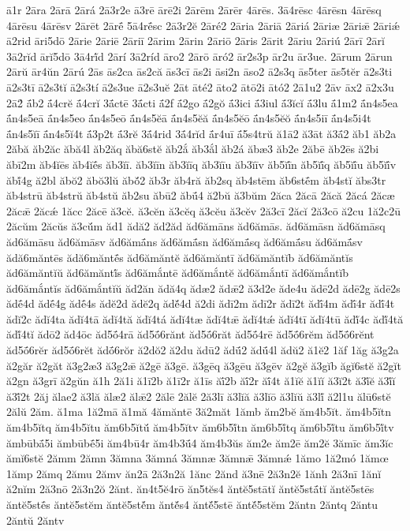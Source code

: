 {ā1r
2āra
2ārā
2ārá
2ā3r2e
ā3rē
ārē2i
2ārēm
2ārēr
4ārēs.
3ā4rēsc
4ārēsn
4ārēsq
4ārēsu
4ārēsv
2ārēt
2ārḗ
5ā4rḗsc
2ā3r2ĕ
2āré2
2āria
2āriā
2āriá
2āriæ
2āriǣ
2āriǽ
ā2rid
āri5dō
2ārie
2āriē
2āriī
2ārim
2ārin
2āriō
2āris
2ārit
2āriu
2āriú
2ārī
2ārĭ
3ā2rĭd
ārĭ5dō
3ā4rĭ́d
2ārí
3ā2ríd
āro2
2ārō
āró2
ār2s3p
ār2u
ār3ue.
2ārum
2ārun
2ārŭ
ār4ŭn
2ārú
2ās
ās2ca
ās2că
ās3cī
ās2i
āsi2n
āso2
ā2s3q
ās5ter
ās5tĕr
ā2s3ti
ā2s3tī
ā2s3tĭ
ā2s3tí
ā2s3ue
ā2s3uĕ
2āt
āté2
āto2
ātō2i
ātó2
2ā1u2
2āv
āx2
ā2x3u
2ā2́
ā́b2
ā́4crĕ
ā́4crĭ
3ā́ctē
3ā́cti
ā́2f
ā́2go
ā́2gŏ
ā́3ici
ā́3iul
ā́3ĭcĭ
ā́3lu
ā́1m2
ā́n4s5ea
ā́n4s5eā
ā́n4s5eo
ā́n4s5eō
ā́n4s5ĕā
ā́n4s5ĕă
ā́n4s5ĕō
ā́n4s5ĕŏ
ā́n4s5iī
ā́n4s5i4t
ā́n4s5ĭī
ā́n4s5ĭ4t
ā́3p2t
ā́3rĕ
3ā́4rid
3ā́4rĭd
ā́r4uī
ā́5s4trŭ
ă1ā2
ă3āt
ă3ā́2
ăb1
ăb2a
2ăbă
ăb2ăc
ăbă4l
ăb2ăq
ăbă6stĕ
ăb2ắ
ăb3ắl
ăb2á
ăbæ3
ăb2e
2ăbē
ăb2ēs
ă2bi
ăbī2m
ăb4ĭēs
ăb4ĭḗs
ăb3ĭī.
ăb3ĭīn
ăb3ĭīq
ăb3ĭīu
ăb3ĭīv
ăb5ĭī́n
ăb5ĭī́q
ăb5ĭī́u
ăb5ĭī́v
ăbĭ́4g
ă2bl
ăbŏ2
ăbŏ3lŭ
ăbŏ́2
ăb3r
ăb4ră
ăb2sq
ăb4stēm
ăb6stḗm
ăb4stĭ
ăbs3tr
ăb4strū
ăb4strŭ
ăb4stŭ
ăb2su
ăbū2
ăbū́4
ă2bŭ
ă3bŭm
2ăca
2ăcā
2ăcă
2ăcá
2ăcæ
2ăcǣ
2ăcǽ
1ăcc
2ăcē
ă3cĕ.
ă3cĕn
ă3cĕq
ă3cĕu
ă3cĕv
2ă3cī
2ăcĭ
2ă3cō
ă2cu
1ă2c2ū
2ăcŭm
2ăcŭs
ă3cŭ́m
ăd1
ădă2
ăd2ăd
ăd6ămāns
ăd6ămās.
ăd6ămāsn
ăd6ămāsq
ăd6ămāsu
ăd6ămāsv
ăd6ămā́ns
ăd6ămā́sn
ăd6ămā́sq
ăd6ămā́su
ăd6ămā́sv
ădă6măntēs
ădă6măntḗs
ăd6ămăntĕ
ăd6ămăntī
ăd6ămăntĭb
ăd6ămăntĭs
ăd6ămăntĭŭ
ăd6ămăntĭ́s
ăd6ămắntē
ăd6ămắntĕ
ăd6ămắntī
ăd6ămắntĭb
ăd6ămắntĭs
ăd6ămắntĭŭ
ăd2ăn
ădă4q
ădæ2
ădǣ2
ă3d2e
ăde4u
ădē2d
ădē2g
ădē2s
ădḗ4d
ădḗ4g
ădḗ4s
ădĕ2d
ădĕ2q
ădĕ́4d
ă2di
ădī2m
ădī2r
ădī2t
ădī́4m
ădī́4r
ădī́4t
ădĭ2c
ădĭ4ta
ădĭ4tā
ădĭ4tă
ădĭ4tá
ădĭ4tæ
ădĭ4tǣ
ădĭ4tǽ
ădĭ4tī
ădĭ4tū
ădĭ́4c
ădĭ́4tă
ădĭ́4tĭ
ădō2
ăd4ōc
ăd5ṓ4rā
ăd5ṓ6rănt
ăd5ṓ6răt
ăd5ṓ4rē
ăd5ṓ6rĕm
ăd5ṓ6rĕnt
ăd5ṓ6rĕr
ăd5ṓ6rĕt
ădṓ6rŏr
ă2dŏ2
ă2du
ădū2
ădū́2
ădū́4l
ădŭ2
ă1ĕ2
1ăf
1ăg
ă3g2a
ă2găr
ă2găt
ă3g2æ3
ă3g2ǣ
ă2gē
ă3gē.
ă3gēq
ă3gēu
ă3gēv
ă2gĕ
ă3gĭb
ăgĭ6stĕ
ă2gĭt
ă2gn
ă3grī
ă2gŭn
ă1h
2ă1i
ă1ī2b
ă1ī2r
ă1īs
ăī́2b
ăī́2r
ăī́4t
ă1ĭĕ
ă1ĭĭ
ă3ĭ2t
ă3ĭ́ĕ
ă3ĭ́ĭ
ă3ĭ́2t
2ăj
ălae2
ă3lă
ălæ2
ălǣ2
2ălē
2ălĕ
2ă3lī
ă3lĭă
ă3lĭō
ă3lĭŭ
ă3lĭ́
ă2l1u
ălū6stĕ
2ălŭ
2ăm.
ă1ma
1ă2mā
ă1mă
4ămăntē
3ă2măt
1ămb
ăm2bĕ
ăm4b5ĭt.
ăm4b5ĭtn
ăm4b5ĭtq
ăm4b5ĭtu
ăm6b5ĭtŭ́
ăm4b5ĭtv
ăm6b5ĭ́tn
ăm6b5ĭ́tq
ăm6b5ĭ́tu
ăm6b5ĭ́tv
ămbūbā́5i
ămbūbḗ5i
ăm4bū4r
ăm4b3ū́4
ăm4b3ŭs
ăm2e
ăm2ē
ăm2ĕ
3ămīc
ăm3ĭc
ămĭ6stĕ
2ămm
2ămn
3ămna
3ămná
3ămnæ
3ămnǣ
3ămnǽ
1ămo
1ă2mó
1ămœ
1ămp
2ămq
2ămu
2ămv
ăn2ā
2ă3n2ă
1ănc
2ănd
ă3nē
2ă3n2ĕ
1ănh
2ă3nī
1ănĭ
ă2nĭm
2ă3nō
2ă3n2ŏ
2ănt.
ăn4t5ĕ4rō
ăn5tĕs4
ăntĕ5stātĭ
ăntĕ5stā́tĭ
ăntĕ5stēs
ăntĕ5stḗs
ăntĕ5stĕm
ăntĕ5stĕ́m
ăntĕ́s4
ăntĕ́5stē
ăntĕ́5stĕm
2ăntn
2ăntq
2ăntu
2ăntŭ
2ăntv
}
